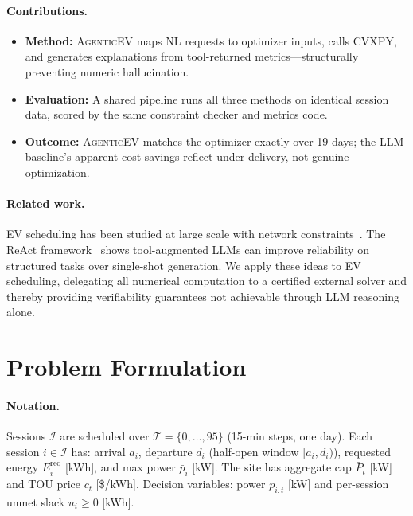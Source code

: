 \documentclass{article}
\newcommand{\modelname}{\textsc{AgenticEV}}
\begin{document}
\paragraph{Contributions.}
\begin{itemize}
  \item \textbf{Method:} \modelname{} maps NL requests to optimizer inputs, calls CVXPY, and generates explanations from tool-returned metrics—structurally preventing numeric hallucination.
  \item \textbf{Evaluation:} A shared pipeline runs all three methods on identical session data, scored by the same constraint checker and metrics code.
  \item \textbf{Outcome:} \modelname{} matches the optimizer exactly over 19 days; the LLM baseline's apparent cost savings reflect under-delivery, not genuine optimization.
\end{itemize}

\paragraph{Related work.}
EV scheduling has been studied at large scale with network constraints~\cite{wang2016survey, lee2020acn}. The ReAct framework~\cite{yao2022react} shows tool-augmented LLMs can improve reliability on structured tasks over single-shot generation. We apply these ideas to EV scheduling, delegating all numerical computation to a certified external solver and thereby providing verifiability guarantees not achievable through LLM reasoning alone.

\section{Problem Formulation}

\paragraph{Notation.}
Sessions $\mathcal{I}$ are scheduled over $\mathcal{T}=\{0,\dots,95\}$ (15-min steps, one day). Each session $i \in \mathcal{I}$ has: arrival $a_i$, departure $d_i$ (half-open window $[a_i,d_i)$), requested energy $E_i^{\text{req}}$ [kWh], and max power $\bar{p}_i$ [kW]. The site has aggregate cap $\bar{P}_t$ [kW] and TOU price $c_t$ [\$/kWh]. Decision variables: power $p_{i,t}$ [kW] and per-session unmet slack $u_i \ge 0$ [kWh].
\end{document}
